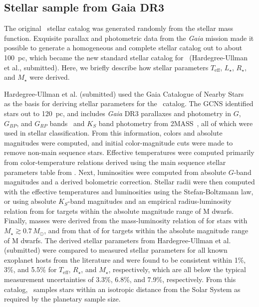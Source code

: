 \documentclass[twocolumn,twocolappendix]{aastex631}
\begin{document}
\subsection{Stellar sample from Gaia DR3}
The original \bioverse\ stellar catalog was generated randomly from the \citet{Chabrier2003} stellar mass function. Exquisite parallax and photometric data from the \textit{Gaia} mission made it possible to generate a homogeneous and complete stellar catalog out to about 100~pc, which became the new standard stellar catalog for \bioverse ~(Hardegree-Ullman et al., submitted). Here, we briefly describe how stellar parameters $T_{\mathrm{eff}}$, $L_{\star}$, $R_{\star}$, and $M_{\star}$ were derived.

Hardegree-Ullman et al. (submitted) used the Gaia Catalogue of Nearby Stars~\citep[hereafter GCNS,][]{Smart2021} as the basis for deriving stellar parameters for the \bioverse\ catalog.
The GCNS identified stars out to 120~pc, and includes \textit{Gaia} DR3 parallaxes and photometry in $G$, $G_{BP}$, and $G_{RP}$ bands~\citep{GaiaCollaboration2022} and $K_S$ band photometry from 2MASS~\citep{Cutri2003}, all of which were used in stellar classification.
From this information, colors and absolute magnitudes were computed, and initial color-magnitude cuts were made to remove non-main sequence stars.
Effective temperatures were computed primarily from color-temperature relations derived using the main sequence stellar parameters table from \citet{Pecaut2013}.
Next, luminosities were computed from absolute $G$-band magnitudes and a derived bolometric correction.
Stellar radii were then computed with the effective temperatures and luminosities using the Stefan-Boltzmann law, or using absolute $K_S$-band magnitudes and an empirical radius-luminosity relation from \citet{Mann2015} for targets within the absolute magnitude range of M dwarfs.
Finally, masses were derived from the mass-luminosity relation of \citet{Torres2010} for stars with $M_{\star}\gtrsim 0.7\,M_{\odot}$, and from that of \citet{Mann2019} for targets within the absolute magnitude range of M dwarfs.
The derived stellar parameters from Hardegree-Ullman et al. (submitted) were compared to measured stellar parameters for all known exoplanet hosts from the literature and were found to be consistent within 1\%, 3\%, and 5.5\% for $T_{\mathrm{eff}}$, $R_{\star}$, and $M_{\star}$, respectively, which are all below the typical measurement uncertainties of 3.3\%, 6.8\%, and 7.9\%, respectively.
From this catalog, \bioverse\ samples stars within an isotropic distance from the Solar System as required by the planetary sample size.
\end{document}
